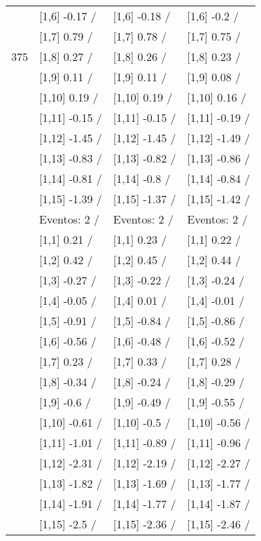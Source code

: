 \begin{table}
\begin{tabular}[t]{llll}
 & {}[1,6] -0.17  / & {}[1,6] -0.18  / & {}[1,6] -0.2  /\\
 & {}[1,7] 0.79  / & {}[1,7] 0.78  / & {}[1,7] 0.75  /\\
375 & {}[1,8] 0.27  / & {}[1,8] 0.26  / & {}[1,8] 0.23  /\\
\addlinespace
 & {}[1,9] 0.11  / & {}[1,9] 0.11  / & {}[1,9] 0.08  /\\
 & {}[1,10] 0.19  / & {}[1,10] 0.19  / & {}[1,10] 0.16  /\\
 & {}[1,11] -0.15  / & {}[1,11] -0.15  / & {}[1,11] -0.19  /\\
 & {}[1,12] -1.45  / & {}[1,12] -1.45  / & {}[1,12] -1.49  /\\
 & {}[1,13] -0.83  / & {}[1,13] -0.82  / & {}[1,13] -0.86  /\\
\addlinespace
 & {}[1,14] -0.81  / & {}[1,14] -0.8  / & {}[1,14] -0.84  /\\
 & {}[1,15] -1.39  / & {}[1,15] -1.37  / & {}[1,15] -1.42  /\\
 & Eventos:  2 / & Eventos:  2 / & Eventos:  2 /\\
 & {}[1,1] 0.21  / & {}[1,1] 0.23  / & {}[1,1] 0.22  /\\
 & {}[1,2] 0.42  / & {}[1,2] 0.45  / & {}[1,2] 0.44  /\\
\addlinespace
 & {}[1,3] -0.27  / & {}[1,3] -0.22  / & {}[1,3] -0.24  /\\
 & {}[1,4] -0.05  / & {}[1,4] 0.01  / & {}[1,4] -0.01  /\\
 & {}[1,5] -0.91  / & {}[1,5] -0.84  / & {}[1,5] -0.86  /\\
 & {}[1,6] -0.56  / & {}[1,6] -0.48  / & {}[1,6] -0.52  /\\
 & {}[1,7] 0.23  / & {}[1,7] 0.33  / & {}[1,7] 0.28  /\\
\addlinespace
500 & {}[1,8] -0.34  / & {}[1,8] -0.24  / & {}[1,8] -0.29  /\\
 & {}[1,9] -0.6  / & {}[1,9] -0.49  / & {}[1,9] -0.55  /\\
 & {}[1,10] -0.61  / & {}[1,10] -0.5  / & {}[1,10] -0.56  /\\
 & {}[1,11] -1.01  / & {}[1,11] -0.89  / & {}[1,11] -0.96  /\\
 & {}[1,12] -2.31  / & {}[1,12] -2.19  / & {}[1,12] -2.27  /\\
\addlinespace
 & {}[1,13] -1.82  / & {}[1,13] -1.69  / & {}[1,13] -1.77  /\\
 & {}[1,14] -1.91  / & {}[1,14] -1.77  / & {}[1,14] -1.87  /\\
 & {}[1,15] -2.5  / & {}[1,15] -2.36  / & {}[1,15] -2.46  /\\
\bottomrule
\end{tabular}
\end{table}
